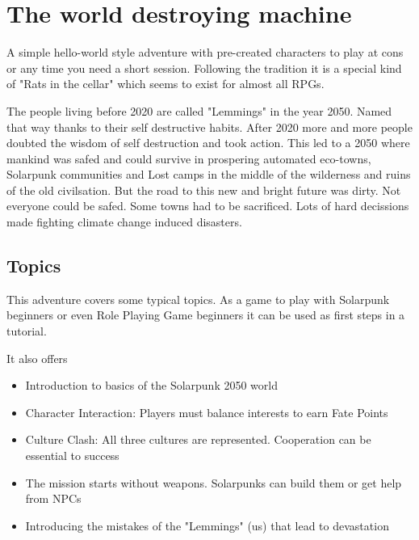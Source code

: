 \chapter{The world destroying machine}

A simple hello-world style adventure with pre-created characters to play at cons or any time you need a short session.
Following the tradition it is a special kind of "Rats in the cellar" which seems to exist for almost all RPGs.

\begin{sidebarBox}[title=Dirty Road to Eden]

The people living before 2020 are called "Lemmings" in the year 2050. Named that way thanks to their self destructive habits. After 2020 more and more people doubted the wisdom of self destruction and took action. This led to a 2050 where mankind was safed and could survive in prospering automated eco-towns, Solarpunk communities and Lost camps in the middle of the wilderness and ruins of the old civilsation. But the road to this new and bright future was dirty. Not everyone could be safed. Some towns had to be sacrificed. Lots of hard decissions made fighting climate change induced disasters. 

\end{sidebarBox}

\section{Topics}

This adventure covers some typical topics. As a game to play with Solarpunk beginners or even Role Playing Game beginners it can be used as first steps in a tutorial.

It also offers

\begin{itemize}
\item Introduction to basics of the Solarpunk 2050 world
\item Character Interaction: Players must balance interests to earn Fate Points
\item Culture Clash: All three cultures are represented. Cooperation can be essential to success
\item The mission starts without weapons. Solarpunks can build them or get help from NPCs
\item Introducing the mistakes of the "Lemmings" (us) that lead to devastation
\end{itemize}

